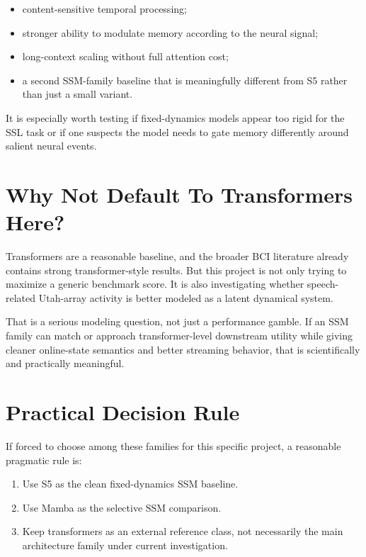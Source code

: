 \begin{itemize}
  \item content-sensitive temporal processing;
  \item stronger ability to modulate memory according to the neural signal;
  \item long-context scaling without full attention cost;
  \item a second SSM-family baseline that is meaningfully different from S5 rather than
  just a small variant.
\end{itemize}

It is especially worth testing if fixed-dynamics models appear too rigid for the SSL task
or if one suspects the model needs to gate memory differently around salient neural events.

\section{Why Not Default To Transformers Here?}

Transformers are a reasonable baseline, and the broader BCI literature already contains
strong transformer-style results. But this project is not only trying to maximize a generic
benchmark score. It is also investigating whether speech-related Utah-array activity is
better modeled as a latent dynamical system.

That is a serious modeling question, not just a performance gamble. If an SSM family can
match or approach transformer-level downstream utility while giving cleaner online-state
semantics and better streaming behavior, that is scientifically and practically meaningful.

\section{Practical Decision Rule}

If forced to choose among these families for this specific project, a reasonable pragmatic
rule is:

\begin{enumerate}
  \item Use S5 as the clean fixed-dynamics SSM baseline.
  \item Use Mamba as the selective SSM comparison.
  \item Keep transformers as an external reference class, not necessarily the main
  architecture family under current investigation.
\end{enumerate}

